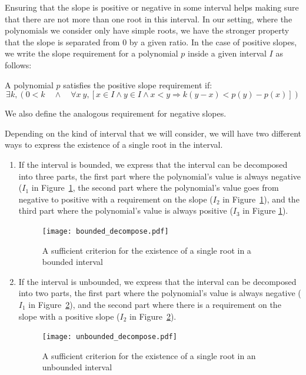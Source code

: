 \documentclass{mscs}
\begin{document}
Ensuring that the slope is positive or negative in some interval helps
making sure that there are not more than one root in this interval.  In our
setting, where the polynomials we consider only have simple roots, we
have the stronger
property that the slope is separated from 0 by a given ratio.  In the
case of positive slopes, we write the slope requirement for a
polynomial \(p\) inside a given interval \(I\) as follows:
\begin{definition}
A polynomial $p$ satisfies the positive slope requirement if:
\[\exists k, (0 < k \quad \wedge \quad \forall x\ y, [x \in I \wedge y \in I
\wedge x < y \Rightarrow k(y - x) < p(y) - p (x)]) \]
\end{definition}
We also define the analogous requirement for negative slopes.

Depending on the kind of interval that we will consider, we will have
two different ways to express the existence of a single root in the
interval.

\begin{enumerate}
\item If the interval is bounded, we express that the interval can be
  decomposed into three parts, the first part where the polynomial's
  value is always negative (\(I_1\) in Figure~\ref{bounded_decompose},
  the second part where the polynomial's
  value goes from negative to positive with a requirement on the
  slope (\(I_2\) in Figure~\ref{bounded_decompose}), and the third
  part where the polynomial's value is always
  positive (\(I_3\) in Figure \ref{bounded_decompose}).
\begin{figure}[h]
\begin{center}
\texttt{[image: bounded\_decompose.pdf]}
\end{center}
\caption{\label{bounded_decompose} A sufficient criterion for the existence of a single root in a bounded interval}
\end{figure}
\item If the interval is unbounded, we express that the interval can
  be decomposed into two parts, the first part where the polynomial's
  value is always negative (\(I_1\) in
  Figure~\ref{unbounded_decompose}), and the second part where there is
  a requirement on the slope with a positive slope (\(I_2\) in
  Figure~\ref{unbounded_decompose}).
\begin{figure}[h]
\begin{center}
\texttt{[image: unbounded\_decompose.pdf]}
\end{center}
\caption{\label{unbounded_decompose} A sufficient criterion for the existence of a single root in an unbounded interval}
\end{figure}
\end{enumerate}
\end{document}
